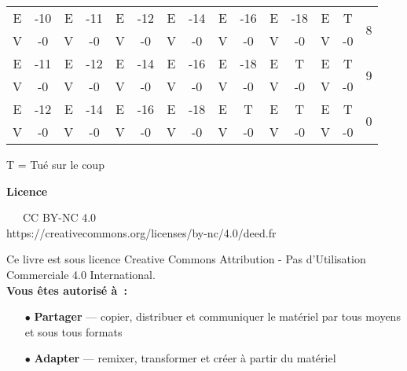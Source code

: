 \documentclass[10pt]{book}
\begin{document}
\begin{minipage}[t]{\textwidth}
{\begin{tabular}{|c c|c c|c c|c c|c c|c c|c c|c|}
      E& -10& E& -11& E& -12& E& -14& E& -16& E& -18& E& T& \multirow{2}{*}{8}\\
      \cline{1-14}
      V& -0& V& -0& V& -0& V& -0& V& -0& V& -0& V& -0& \\
      \hline
      
      E& -11& E& -12& E& -14& E& -16& E& -18& E& T& E& T& \multirow{2}{*}{9}\\
      \cline{1-14}
      V& -0& V& -0& V& -0& V& -0& V& -0& V& -0& V& -0& \\
      \hline
      
      E& -12& E& -14& E& -16& E& -18& E& T& E& T& E& T& \multirow{2}{*}{0}\\
      \cline{1-14}
      V& -0& V& -0& V& -0& V& -0& V& -0& V& -0& V& -0& \\
      \hline
  \end{tabular}}
\end{minipage}

\begin{center}
  T = Tué sur le coup
\end{center}


\newpage
\begin{center}
  \textbf{\Large Licence}
\end{center}
\vspace{-0.2cm}



\begin{center}
  \faCreativeCommons\ \faCreativeCommonsBy\ \faCreativeCommonsNc\ CC BY-NC 4.0\\[.4cm]
  https://creativecommons.org/licenses/by-nc/4.0/deed.fr\\
\end{center}

Ce livre est sous licence Creative Commons Attribution - Pas d’Utilisation Commerciale 4.0 International.\\

\textbf{Vous êtes autorisé à~:}\\
  \begin{itemize}
    \item[$\bullet$] \textbf{Partager} — copier, distribuer et communiquer le matériel par tous moyens et sous tous formats\\
    \item[$\bullet$] \textbf{Adapter} — remixer, transformer et créer à partir du matériel\\
  \end{itemize}
\end{document}
